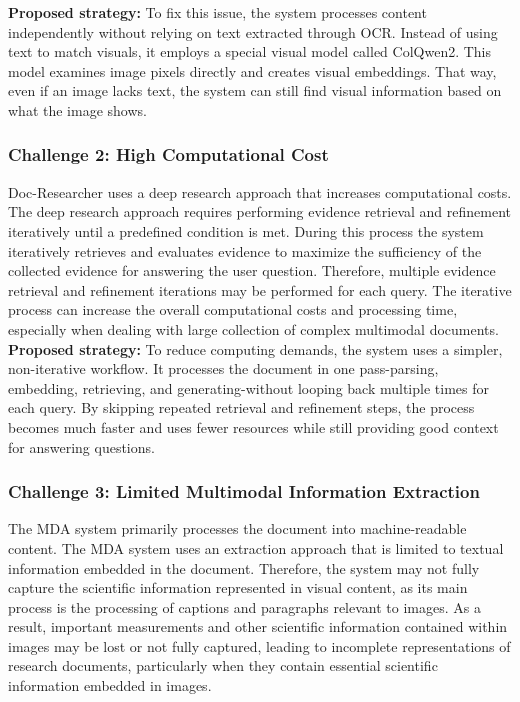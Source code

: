 \documentclass[11pt,a4paper]{report}
\begin{document}
\textbf{Proposed strategy:} To fix this issue, the system processes content independently without relying on text extracted through \ac{OCR}. Instead of using text to match visuals, it employs a special visual model called ColQwen2. This model examines image pixels directly and creates visual embeddings. That way, even if an image lacks text, the system can still find visual information based on what the image shows. 

\subsubsection{Challenge 2: High Computational Cost}
Doc-Researcher \cite{Dong2026DocResearcherAU} uses a deep research approach that increases computational costs. The deep research approach requires performing evidence retrieval and refinement iteratively until a predefined condition is met. During this process the system iteratively retrieves and evaluates evidence to maximize the sufficiency of the collected evidence for answering the user question. Therefore, multiple evidence retrieval and refinement iterations may be performed for each query. The iterative process can increase the overall computational costs and processing time, especially when dealing with large collection of complex multimodal documents.\\ 

\textbf{Proposed strategy:} To reduce computing demands, the system uses a simpler, non-iterative workflow. It processes the document in one pass-parsing, embedding, retrieving, and generating-without looping back multiple times for each query. By skipping repeated retrieval and refinement steps, the process becomes much faster and uses fewer resources while still providing good context for answering questions. 

\subsubsection{Challenge 3: Limited Multimodal Information Extraction}
The \ac{MDA} system \cite{Chandrasekhar2026MaterialDA} primarily processes the document into machine-readable content. The MDA system uses an extraction approach that is limited to textual information embedded in the document. Therefore, the system may not fully capture the scientific information represented in visual content, as its main process is the processing of captions and paragraphs relevant to images. As a result, important measurements and other scientific information contained within images may be lost or not fully captured, leading to incomplete representations of research documents, particularly when they contain essential scientific information embedded in images.\\
\end{document}
